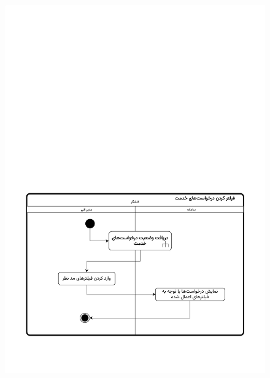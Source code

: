 \begin{figure}[ht!]
	\centering
	\includegraphics[scale=0.8, page=1]{figs/OOD-activity-filterreqrep.pdf}
\end{figure}
\FloatBarrier
\newpage


